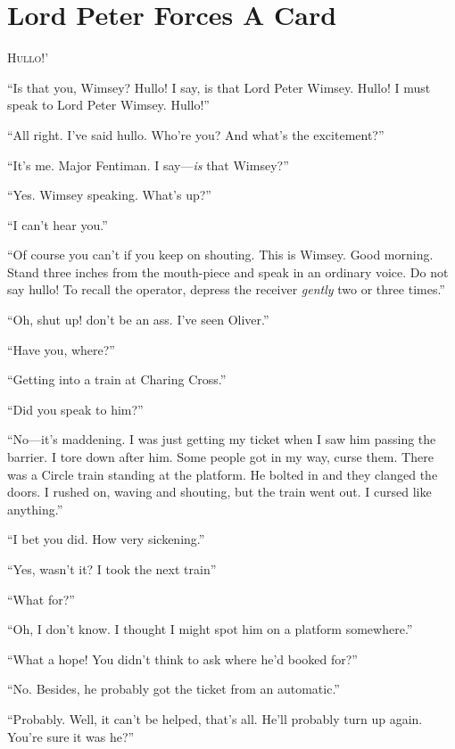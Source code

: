 \chapter{Lord Peter Forces A Card}

\lettrine[lines=4,ante=‘]{H}{ullo}!' 

\zz
\enquote{Is that you, Wimsey? Hullo! I say, is that Lord Peter Wimsey. Hullo! I must speak to Lord Peter Wimsey. Hullo!} 

\zz
\enquote{All right. I've said hullo. Who're you? And what's the excitement?}

\enquote{It's me. Major Fentiman. I say---\textit{is} that Wimsey?}

\enquote{Yes. Wimsey speaking. What's up?}

\enquote{I can't hear you.}

\enquote{Of course you can't if you keep on shouting. This is Wimsey. Good morning. Stand three inches from the mouth-piece and speak in an ordinary voice. Do not say hullo! To recall the operator, depress the receiver \textit{gently} two or three times.}

\enquote{Oh, shut up! don't be an ass. I've seen Oliver.}

\enquote{Have you, where?}

\enquote{Getting into a train at Charing Cross.}

\enquote{Did you speak to him?}

\enquote{No\allowbreak---\allowbreak it's maddening. I was just getting my ticket when I saw him passing the barrier. I tore down after him. Some people got in my way, curse them. There was a Circle train standing at the platform. He bolted in and they clanged the doors. I rushed on, waving and shouting, but the train went out. I cursed like anything.}

\enquote{I bet you did. How very sickening.}

\enquote{Yes, wasn't it? I took the next train\longdash}

\enquote{What for?}

\enquote{Oh, I don't know. I thought I might spot him on a platform somewhere.}

\enquote{What a hope! You didn't think to ask where he'd booked for?}

\enquote{No. Besides, he probably got the ticket from an automatic.}

\enquote{Probably. Well, it can't be helped, that's all. He'll probably turn up again. You're sure it was he?}

